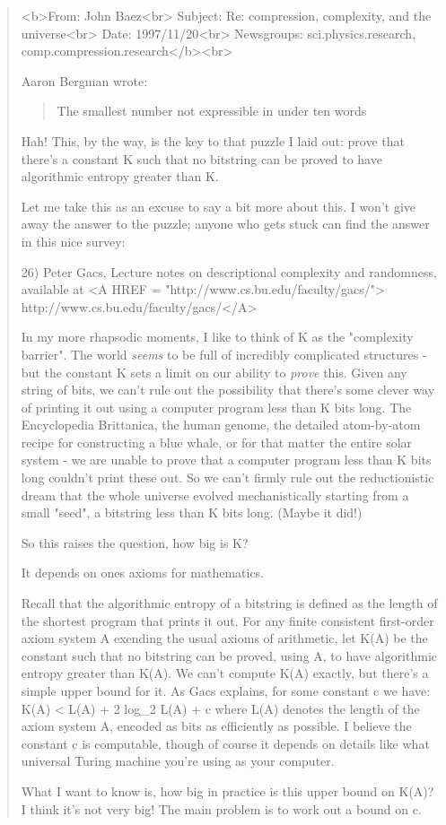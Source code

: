 \begin{quote}
<b>From: John Baez<br>
Subject: Re: compression, complexity, and the universe<br>
Date: 1997/11/20<br>
Newsgroups: sci.physics.research, comp.compression.research</b><br>


Aaron Bergman wrote:

\begin{quote}
The smallest number not expressible in under ten words
\end{quote}

Hah!  This, by the way, is the key to that puzzle I laid out: 
prove that there's a constant K such that no bitstring can be 
proved to have algorithmic entropy greater than K.   

Let me take this as an excuse to say a bit more about this.
I won't give away the answer to the puzzle; anyone who gets
stuck can find the answer in this nice survey:

26) Peter Gacs, Lecture notes on descriptional complexity and randomness, 
available at <A HREF = "http://www.cs.bu.edu/faculty/gacs/"> http://www.cs.bu.edu/faculty/gacs/</A>

In my more rhapsodic moments, I like to think of K as the 
"complexity barrier".  The world \emph{seems} to be full of incredibly 
complicated structures - but the constant K sets a limit on our 
ability to \emph{prove} this.   Given any string of bits, we can't rule 
out the possibility that there's some clever way of printing it 
out using a computer program less than K bits long.  The Encyclopedia 
Brittanica, the human genome, the detailed atom-by-atom recipe for 
constructing a blue whale, or for that matter the entire solar system 
- we are unable to prove that a computer program less than K bits 
long couldn't print these out.  So we can't firmly rule out the 
reductionistic dream that the whole universe evolved mechanistically 
starting from a small "seed", a bitstring less than K bits long.  
(Maybe it did!)

So this raises the question, how big is K?

It depends on ones axioms for mathematics.  

Recall that the algorithmic entropy of a bitstring is defined
as the length of the shortest program that prints it out.  For
any finite consistent first-order axiom system A exending the
usual axioms of arithmetic, let K(A) be the constant such that
no bitstring can be proved, using A, to have algorithmic entropy
greater than K(A).  We can't compute K(A) exactly, but there's a 
simple upper bound for it.  As Gacs explains, for some constant c 
we have:
K(A) < L(A) + 2 log_{2} L(A) + c
where L(A) denotes the length of the axiom system A, encoded as
bits as efficiently as possible.  I believe the constant c is 
computable, though of course it depends on details like what 
universal Turing machine you're using as your computer.  

What I want to know is, how big in practice is this upper
bound on K(A)?  I think it's not very big!   The main problem 
is to work out a bound on c.
\end{quote}

